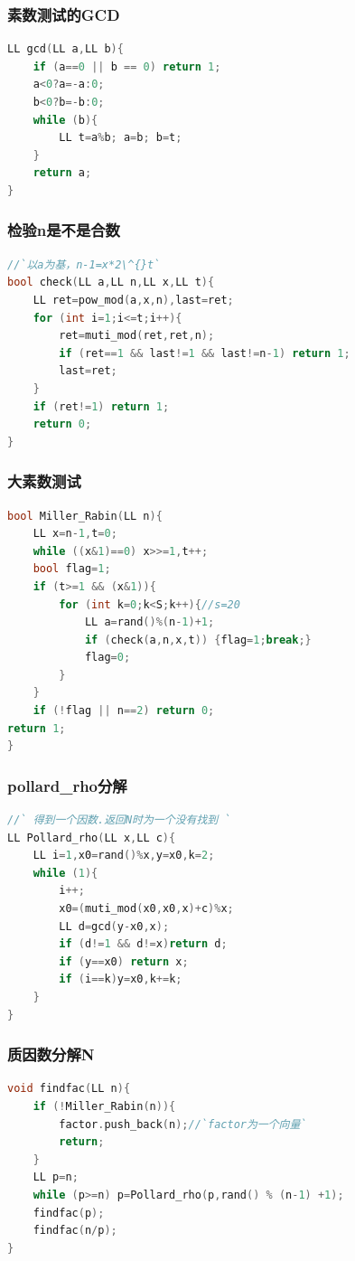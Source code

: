 \documentclass[a4paper]{article}
\begin{document}
\begin{CJK*}{UTF8}{gbsn}
\begin{multicols}{3}
\begin{flushleft}
\subsubsection{素数测试的GCD}
\begin{lstlisting}[language={c++}]
LL gcd(LL a,LL b){
    if (a==0 || b == 0) return 1;
    a<0?a=-a:0;
    b<0?b=-b:0;
    while (b){
        LL t=a%b; a=b; b=t;
    }
    return a;
}
\end{lstlisting}

\subsubsection{检验n是不是合数}
\begin{lstlisting}[language={c++}]
//`以a为基，n-1=x*2\^{}t`
bool check(LL a,LL n,LL x,LL t){   
    LL ret=pow_mod(a,x,n),last=ret;
    for (int i=1;i<=t;i++){
        ret=muti_mod(ret,ret,n);
        if (ret==1 && last!=1 && last!=n-1) return 1;
        last=ret;
    }
    if (ret!=1) return 1;
    return 0;
}
\end{lstlisting}



\subsubsection{大素数测试}
\begin{lstlisting}[language={c++}]
bool Miller_Rabin(LL n){
    LL x=n-1,t=0;
    while ((x&1)==0) x>>=1,t++;
    bool flag=1;
    if (t>=1 && (x&1)){
        for (int k=0;k<S;k++){//s=20
            LL a=rand()%(n-1)+1;
            if (check(a,n,x,t)) {flag=1;break;}
            flag=0;
        }
    }
    if (!flag || n==2) return 0;
return 1;   
}
\end{lstlisting}

\subsubsection{pollard\_rho分解}
\begin{lstlisting}[language={c++}]
//` 得到一个因数.返回N时为一个没有找到 `
LL Pollard_rho(LL x,LL c){
    LL i=1,x0=rand()%x,y=x0,k=2;
    while (1){
        i++;
        x0=(muti_mod(x0,x0,x)+c)%x;
        LL d=gcd(y-x0,x);
        if (d!=1 && d!=x)return d;
        if (y==x0) return x;
        if (i==k)y=x0,k+=k;
    }
}
\end{lstlisting}


\subsubsection{质因数分解N }
\begin{lstlisting}[language={c++}]
void findfac(LL n){           
    if (!Miller_Rabin(n)){
        factor.push_back(n);//`factor为一个向量`
        return;
    }
    LL p=n;
    while (p>=n) p=Pollard_rho(p,rand() % (n-1) +1);
    findfac(p);
    findfac(n/p);
}
\end{lstlisting}


\end{flushleft}
\end{multicols}
\end{CJK*}
\end{document}
